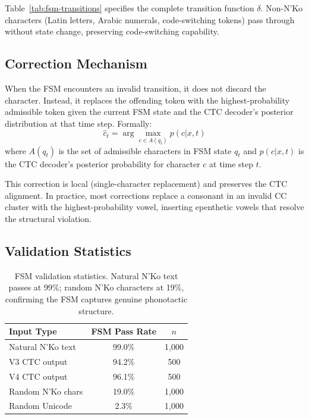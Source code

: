 \documentclass[11pt]{article}
\begin{document}
Table~\ref{tab:fsm-transitions} specifies the complete transition function $\delta$.
Non-N'Ko characters (Latin letters, Arabic numerals, code-switching tokens) pass through without state change, preserving code-switching capability.

\subsection{Correction Mechanism}

When the FSM encounters an invalid transition, it does not discard the character.
Instead, it replaces the offending token with the highest-probability admissible token given the current FSM state and the CTC decoder's posterior distribution at that time step.
Formally:
\begin{equation}
\hat{c}_t = \arg\max_{c \in A(q_t)} p(c | x, t)
\end{equation}
where $A(q_t)$ is the set of admissible characters in FSM state $q_t$ and $p(c | x, t)$ is the CTC decoder's posterior probability for character $c$ at time step $t$.

This correction is local (single-character replacement) and preserves the CTC alignment.
In practice, most corrections replace a consonant in an invalid CC cluster with the highest-probability vowel, inserting epenthetic vowels that resolve the structural violation.

\subsection{Validation Statistics}

\begin{table}[t]
\centering
\small
\begin{tabular}{lcc}
\toprule
\textbf{Input Type} & \textbf{FSM Pass Rate} & \textbf{$n$} \\
\midrule
Natural N'Ko text & 99.0\% & 1,000 \\
V3 CTC output & 94.2\% & 500 \\
V4 CTC output & 96.1\% & 500 \\
Random N'Ko chars & 19.0\% & 1,000 \\
Random Unicode & 2.3\% & 1,000 \\
\bottomrule
\end{tabular}
\caption{FSM validation statistics. Natural N'Ko text passes at 99\%; random N'Ko characters at 19\%, confirming the FSM captures genuine phonotactic structure.}
\label{tab:fsm-validation}
\end{table}
\end{document}
